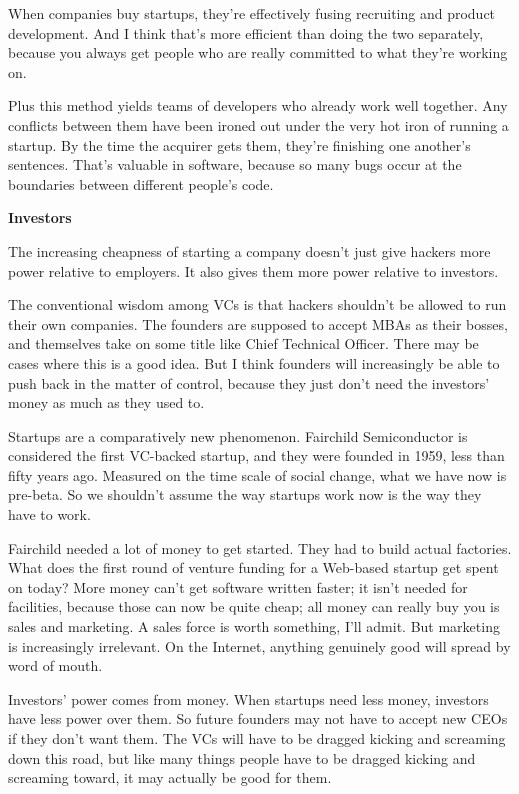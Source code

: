 When companies buy startups, they're effectively fusing recruiting and
product development. And I think that's more efficient than doing the
two separately, because you always get people who are really committed
to what they're working on.

Plus this method yields teams of developers who already work well
together. Any conflicts between them have been ironed out under the very
hot iron of running a startup. By the time the acquirer gets them,
they're finishing one another's sentences. That's valuable in software,
because so many bugs occur at the boundaries between different people's
code.

\textbf{Investors}

The increasing cheapness of starting a company doesn't just give hackers
more power relative to employers. It also gives them more power relative
to investors.

The conventional wisdom among VCs is that hackers shouldn't be allowed
to run their own companies. The founders are supposed to accept MBAs as
their bosses, and themselves take on some title like Chief Technical
Officer. There may be cases where this is a good idea. But I think
founders will increasingly be able to push back in the matter of
control, because they just don't need the investors' money as much as
they used to.

Startups are a comparatively new phenomenon. Fairchild Semiconductor is
considered the first VC-backed startup, and they were founded in 1959,
less than fifty years ago. Measured on the time scale of social change,
what we have now is pre-beta. So we shouldn't assume the way startups
work now is the way they have to work.

Fairchild needed a lot of money to get started. They had to build actual
factories. What does the first round of venture funding for a Web-based
startup get spent on today? More money can't get software written
faster; it isn't needed for facilities, because those can now be quite
cheap; all money can really buy you is sales and marketing. A sales
force is worth something, I'll admit. But marketing is increasingly
irrelevant. On the Internet, anything genuinely good will spread by word
of mouth.

Investors' power comes from money. When startups need less money,
investors have less power over them. So future founders may not have to
accept new CEOs if they don't want them. The VCs will have to be dragged
kicking and screaming down this road, but like many things people have
to be dragged kicking and screaming toward, it may actually be good for
them.

